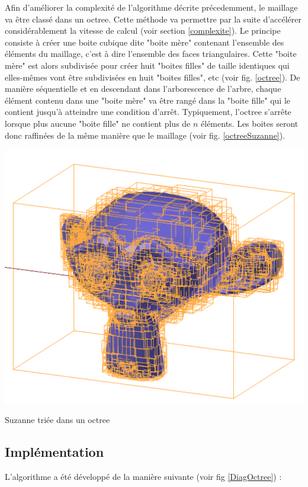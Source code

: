 Afin d'améliorer la complexité de l'algorithme décrite précedemment, le maillage va être classé dans un \gls{octree}. Cette méthode va permettre par la suite d'accélérer considérablement la vitesse de calcul \cite[p. 5]{octree} (voir section \ref{complexite}). Le principe consiste à créer une boite cubique dite "boite mère" contenant l'ensemble des éléments du maillage, c'est à dire l'ensemble des faces triangulaires. Cette "boite mère" est alors subdivisée pour créer huit "boites filles" de taille identiques qui elles-mêmes vont être subdivisées en huit "boites filles", etc (voir fig. \ref{octree}). De manière séquentielle et en descendant dans l'arborescence de l'arbre, chaque élément contenu dans une "boite mère" va être rangé dans la "boite fille" qui le contient jusqu'à atteindre une condition d'arrêt. Typiquement, l'\gls{octree} s'arrête lorsque plus aucune "boite fille" ne contient plus de $n$ éléments. Les boites seront donc raffinées de la même manière que le maillage (voir fig. \ref{octreeSuzanne}).

\begin{figureth}
	\includegraphics[width=0.6\linewidth]{images/octreeSuzanne}
	\caption{Suzanne triée dans un \gls{octree}}
	\label{octreeSuzanne}
\end{figureth}




\subsection{Implémentation}
L'algorithme a été développé de la manière suivante (voir fig \ref{DiagOctree}) :

